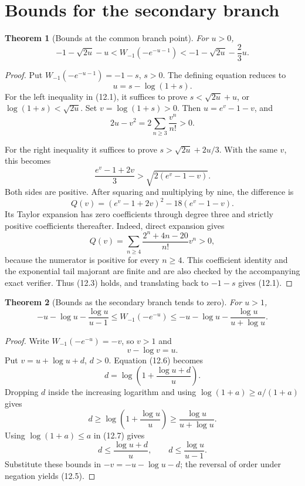 \documentclass[11pt]{article}
\newtheorem{theorem}{Theorem}[section]
\theoremstyle{definition}
\begin{document}
\section{Bounds for the secondary branch}\label{sec:bounds-secondary}

\begin{theorem}[Bounds at the common branch point]\label{thm:wm-near}
For \(u>0\),
\[
 -1-\sqrt{2u}-u
 <W_{-1}(-e^{-u-1})
 <-1-\sqrt{2u}-\frac23u.
 \tag{12.1}
\]
\end{theorem}

\begin{proof}
Put \(W_{-1}(-e^{-u-1})=-1-s\), \(s>0\).  The defining equation reduces to
\[
 u=s-\log(1+s).
 \tag{12.2}
\]
For the left inequality in (12.1), it suffices to prove
\(s<\sqrt{2u}+u\), or
\(\log(1+s)<\sqrt{2u}\).  Set \(v=\log(1+s)>0\).  Then
\(u=e^v-1-v\), and
\[
 2u-v^2=2\sum_{n\ge3}\frac{v^n}{n!}>0.
\]

For the right inequality it suffices to prove
\(s>\sqrt{2u}+2u/3\).  With the same \(v\), this becomes
\[
 \frac{e^v-1+2v}{3}>\sqrt{2(e^v-1-v)}.
 \tag{12.3}
\]
Both sides are positive.  After squaring and multiplying by nine, the
difference is
\[
 Q(v)=(e^v-1+2v)^2-18(e^v-1-v).
 \tag{12.4}
\]
Its Taylor expansion has zero coefficients through degree three and strictly
positive coefficients thereafter.  Indeed, direct expansion gives
\[
 Q(v)=\sum_{n\ge4}\frac{2^n+4n-20}{n!}v^n>0,
\tag{12.5a}
\]
because the numerator is positive for every $n\ge4$.  This coefficient
identity and the exponential tail majorant are finite and are also checked by
the accompanying exact verifier.  Thus (12.3) holds,
and translating back to \(-1-s\) gives (12.1).
\end{proof}

\begin{theorem}[Bounds as the secondary branch tends to zero]\label{thm:wm-far}
For \(u>1\),
\[
 -u-\log u-\frac{\log u}{u-1}
 \le W_{-1}(-e^{-u})
 \le -u-\log u-\frac{\log u}{u+\log u}.
 \tag{12.5}
\]
\end{theorem}

\begin{proof}
Write \(W_{-1}(-e^{-u})=-v\), so \(v>1\) and
\[
 v-\log v=u.
 \tag{12.6}
\]
Put \(v=u+\log u+d\), \(d>0\).  Equation (12.6) becomes
\[
 d=\log\left(1+\frac{\log u+d}{u}\right).
 \tag{12.7}
\]
Dropping \(d\) inside the increasing logarithm and using
\(\log(1+a)\ge a/(1+a)\) gives
\[
 d\ge\log\left(1+\frac{\log u}{u}\right)
 \ge\frac{\log u}{u+\log u}.
 \tag{12.8}
\]
Using \(\log(1+a)\le a\) in (12.7) gives
\[
 d\le\frac{\log u+d}{u},
 \qquad d\le\frac{\log u}{u-1}.
 \tag{12.9}
\]
Substitute these bounds in \(-v=-u-\log u-d\); the reversal of order under
negation yields (12.5).
\end{proof}
\end{document}
